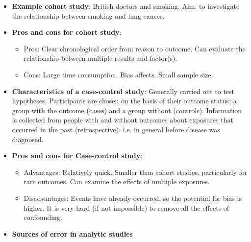 \documentclass[12pt]{book}
\begin{document}
\begin{itemize}
\begin{itemize}
    \end{itemize}
\item \textbf{Example cohort study}: British doctors and smoking. Aim: to investigate the relationship between smoking and lung cancer.
\item \textbf{Pros and cons for cohort study}:
    \begin{itemize}
    \item Pros: Clear chronological order from reason to outcome. Can evaluate the relationship between multiple results and factor(s).
    \item Cons: Large time consumption. Bias affects. Small sample size.
    \end{itemize}
\item \textbf{Characteristics of a case-control study}: Generally carried out to test hypotheses. Participants are chosen on the basis of their outcome status: a group with the outcome (cases) and a group without (controls). Information is collected from people with and without outcomes about exposures that occurred in the past (retrospective). i.e. in general before disease was diagnosed.
\item \textbf{Pros and cons for Case-control study}:
    \begin{itemize}
    \item Advantages: Relatively quick. Smaller than cohort studies, particularly for rare outcomes. Can examine the effects of multiple exposures.
    \item Disadvantages: Events have already occurred, so the potential for bias is higher. It is very hard (if not impossible) to remove all the effects of confounding.
    \end{itemize}
\item \textbf{Sources of error in analytic studies}



\end{itemize}
\end{document}
